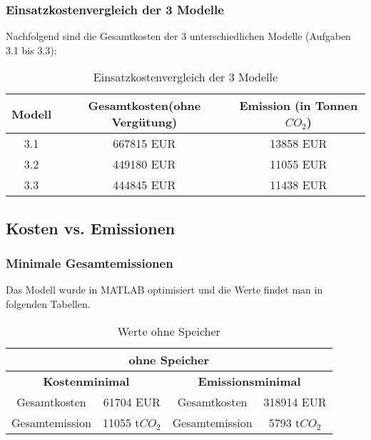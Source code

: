 \documentclass{eegreport}
\begin{document}
\subsubsection{Einsatzkostenvergleich der 3 Modelle}
Nachfolgend sind die Gesamtkosten der 3 unterschiedlichen Modelle (Aufgaben 3.1 bis 3.3):

\begin{table}[h]
\begin{center}
\begin{tabular}{|c|c|c|}
\hline 
Modell & Gesamtkosten(ohne Vergütung) & Emission (in Tonnen $CO_2$) \\ 
\hline 
3.1 & 667815 EUR & 13858 EUR \\ 
\hline 
3.2 & 449180 EUR & 11055 EUR \\ 
\hline 
3.3 & 444845 EUR & 11438 EUR \\ 
\hline 
\end{tabular} 
\end{center}
\caption{Einsatzkostenvergleich der 3 Modelle}
\label{ad}
\end{table}

\newpage

\subsection{Kosten vs. Emissionen}
\subsubsection{Minimale Gesamtemissionen}
Das Modell wurde in MATLAB optimisiert und die Werte findet man in folgenden Tabellen.

\begin{table}[h]
\begin{center}
\begin{tabular}{|c|c|c|c|}
\hline
\multicolumn{4}{|c|}{\textbf{ohne Speicher}} \\
\hline 
\multicolumn{2}{|c|}{\textbf{Kostenminimal}} & \multicolumn{2}{|c|}{\textbf{Emissionsminimal}} \\ 
\hline 
Gesamtkosten & 61704 EUR & Gesamtkosten & 318914 EUR \\ 
\hline 
Gesamtemission & 11055 t$CO_2$ & Gesamtemission & 5793 t$CO_2$ \\ 
\hline 
\end{tabular} 
\end{center}
\caption{Werte ohne Speicher}
\label{wos}
\end{table}
\end{document}
